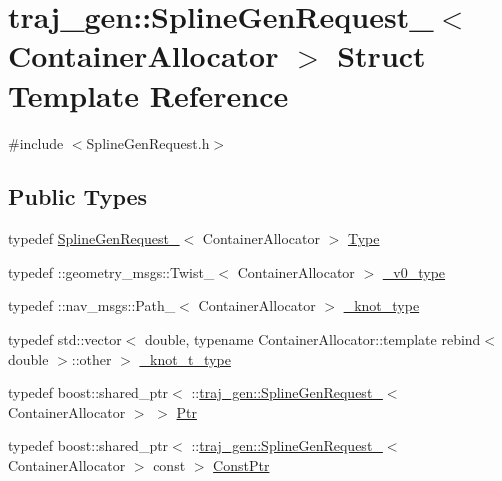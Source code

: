 \hypertarget{structtraj__gen_1_1_spline_gen_request__}{}\section{traj\+\_\+gen\+:\+:Spline\+Gen\+Request\+\_\+$<$ Container\+Allocator $>$ Struct Template Reference}
\label{structtraj__gen_1_1_spline_gen_request__}


{\ttfamily \#include $<$Spline\+Gen\+Request.\+h$>$}

\subsection*{Public Types}
\begin{DoxyCompactItemize}
\item 
typedef \hyperlink{structtraj__gen_1_1_spline_gen_request__}{Spline\+Gen\+Request\+\_\+}$<$ Container\+Allocator $>$ \hyperlink{structtraj__gen_1_1_spline_gen_request___aa8239a7478db4d96944122430fd1ab3f}{Type}
\item 
typedef \+::geometry\+\_\+msgs\+::\+Twist\+\_\+$<$ Container\+Allocator $>$ \hyperlink{structtraj__gen_1_1_spline_gen_request___ae09e79b3dca72bb90798d17eba2a467a}{\+\_\+v0\+\_\+type}
\item 
typedef \+::nav\+\_\+msgs\+::\+Path\+\_\+$<$ Container\+Allocator $>$ \hyperlink{structtraj__gen_1_1_spline_gen_request___a24a664250b46a3a7327876929deac6c4}{\+\_\+knot\+\_\+type}
\item 
typedef std\+::vector$<$ double, typename Container\+Allocator\+::template rebind$<$ double $>$\+::other $>$ \hyperlink{structtraj__gen_1_1_spline_gen_request___adb20ee842cb5f2dce6ad7994e5590b3f}{\+\_\+knot\+\_\+t\+\_\+type}
\item 
typedef boost\+::shared\+\_\+ptr$<$ \+::\hyperlink{structtraj__gen_1_1_spline_gen_request__}{traj\+\_\+gen\+::\+Spline\+Gen\+Request\+\_\+}$<$ Container\+Allocator $>$ $>$ \hyperlink{structtraj__gen_1_1_spline_gen_request___a099311245799078bf44ec6e87e027ea3}{Ptr}
\item 
typedef boost\+::shared\+\_\+ptr$<$ \+::\hyperlink{structtraj__gen_1_1_spline_gen_request__}{traj\+\_\+gen\+::\+Spline\+Gen\+Request\+\_\+}$<$ Container\+Allocator $>$ const  $>$ \hyperlink{structtraj__gen_1_1_spline_gen_request___a258449232931253cfcdc867697a26c0d}{Const\+Ptr}
\end{DoxyCompactItemize}

